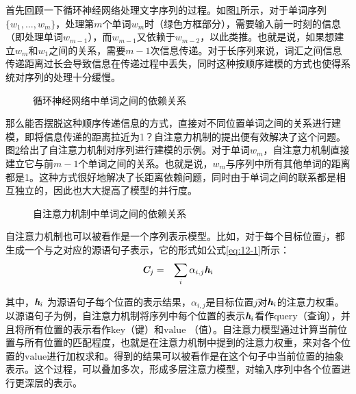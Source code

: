 \parinterval 首先回顾一下循环神经网络处理文字序列的过程。如图\ref{fig:12-1}所示，对于单词序列$\{ w_1,...,w_m \}$，处理第$m$个单词$w_m$时（绿色方框部分），需要输入前一时刻的信息（即处理单词$w_{m-1}$），而$w_{m-1}$又依赖于$w_{m-2}$，以此类推。也就是说，如果想建立$w_m$和$w_1$之间的关系，需要$m-1$次信息传递。对于长序列来说，词汇之间信息传递距离过长会导致信息在传递过程中丢失，同时这种按顺序建模的方式也使得系统对序列的处理十分缓慢。

\begin{figure}[htp]
\centering

\caption{循环神经网络中单词之间的依赖关系}
\label{fig:12-1}
\end{figure}

\parinterval 那么能否摆脱这种顺序传递信息的方式，直接对不同位置单词之间的关系进行建模，即将信息传递的距离拉近为1？自注意力机制的提出便有效解决了这个问题。图\ref{fig:12-2}给出了自注意力机制对序列进行建模的示例。对于单词$w_m$，自注意力机制直接建立它与前$m-1$个单词之间的关系。也就是说，$w_m$与序列中所有其他单词的距离都是1。这种方式很好地解决了长距离依赖问题，同时由于单词之间的联系都是相互独立的，因此也大大提高了模型的并行度。

\begin{figure}[htp]
\centering

\caption{自注意力机制中单词之间的依赖关系}
\label{fig:12-2}
\end{figure}

\parinterval 自注意力机制也可以被看作是一个序列表示模型。比如，对于每个目标位置$j$，都生成一个与之对应的源语句子表示，它的形式如公式\eqref{eq:12-1}所示：
\begin{eqnarray}
\textbf{\em C}_j & = & \sum_i \alpha_{i,j}\textbf{\em h}_i
\label{eq:12-1}
\end{eqnarray}

\noindent 其中，$\textbf{\em h}_i$ 为源语句子每个位置的表示结果，$\alpha_{i,j}$是目标位置$j$对$\textbf{\em h}_i$的注意力权重。以源语句子为例，自注意力机制将序列中每个位置的表示$\textbf{\em h}_i$看作$\mathrm{query}$（查询），并且将所有位置的表示看作$\mathrm{key}$（键）和$\mathrm{value}$ （值）。自注意力模型通过计算当前位置与所有位置的匹配程度，也就是在注意力机制中提到的注意力权重，来对各个位置的$\mathrm{value}$进行加权求和。得到的结果可以被看作是在这个句子中当前位置的抽象表示。这个过程，可以叠加多次，形成多层注意力模型，对输入序列中各个位置进行更深层的表示。

